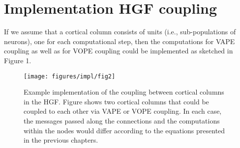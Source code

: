 \section{Implementation HGF coupling}

If we assume that a cortical column consists of units (i.e., sub-populations of neurons), one for each computational step, then the computations for \textsf{VAPE coupling} as well as for \textsf{VOPE coupling} could be implemented as sketched in Figure 1.

\begin{figure}[h]
	\texttt{[image: figures/impl/fig2]}
	\caption{Example implementation of the coupling between cortical columns in the HGF. Figure shows two cortical columns that could be coupled to each other via VAPE or VOPE coupling. In each case, the messages passed along the connections and the computations within the nodes would differ according to the equations presented in the previous chapters.}
\end{figure}

